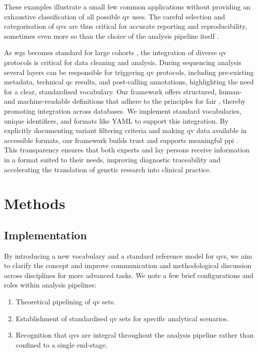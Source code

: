  These examples illustrate a small few common applications without providing an exhaustive classification of all possible \ac{qv} uses.
The careful selection and categorisation of \ac{qv}s are thus critical for accurate reporting and reproducibility, sometimes even more so than the choice of the analysis pipeline itself \cite{olson2023variant}.

As \ac{wgs} becomes standard for large cohorts \cite{lee2018gene, jansen2019genome}, the integration of diverse \ac{qv} protocols is critical for data cleaning and analysis. 
During sequencing analysis several layers can be responsible for triggering \ac{qv} protocols, including
pre-existing metadata, technical \ac{qc} results, and post-calling annotations,
highlighting the need for a clear, standardised vocabulary. Our framework offers structured, human- and machine-readable definitions that adhere to the principles for  \ac{fair} \cite{wilkinson2016fair}, thereby promoting  integration across databases. 
We implement standard vocabularies, unique identifiers, and formats like YAML to support this integration.
By explicitly documenting variant filtering criteria and making \ac{qv} data available in accessible formats, our framework builds trust and supports meaningful \ac{ppi} \cite{morris_answer_2011}. This transparency ensures that both experts and lay persons receive information in a format suited to their needs, improving diagnostic traceability and accelerating the translation of genetic research into clinical practice.

\section{Methods}
\subsection{Implementation} \label{sec:framework}

By introducing a new vocabulary and a standard reference model for \ac{qv}s, we aim to clarify the concept and improve communication and methodological discussion across disciplines for more advanced tasks.
We note a few brief configurations and roles within analysis pipelines:
\begin{enumerate}
    \item Theoretical pipelining of \ac{qv} sets.
    \item Establishment of standardised \ac{qv} sets for specific analytical scenarios.
    \item Recognition that \ac{qv}s are integral throughout the analysis pipeline rather than confined to a single end-stage.
\end{enumerate}

